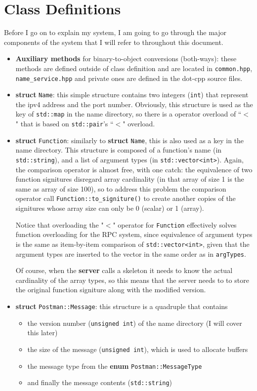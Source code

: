 \section{Class Definitions}
Before I go on to explain my system, I am going to go through the major components of the system that I will refer to throughout this document.

\begin{itemize}
\item
{\bf Auxiliary methods} for binary-to-object conversions (both-ways): these methods are defined outside of class definition and are located in {\tt common.hpp}, {\tt name\_service.hpp} and private ones are defined in the dot-cpp source files.
\item
{\bf struct} {\tt Name}: this simple structure contains two integers ({\tt int}) that represent the ipv4 address and the port number.
Obviously, this structure is used as the key of {\tt std::map} in the name directory, so there is a operator overload of ``$<$" that is based on {\tt std::pair}'s ``$<$" overload.

\item
{\bf struct} {\tt Function}: similarly to {\bf struct} {\tt Name}, this is also used as a key in the name directory.
This structure is composed of a function's name (in {\tt std::string}), and a list of argument types (in {\tt std::vector<int>}).
Again, the comparison operator is almost free, with one catch: the equivalence of two function signitures disregard array cardinality (in that array of size 1 is the same as array of size 100), so to address this problem the comparison operator call {\tt Function::to\_signiture()} to create another copies of the signitures whose array size can only be 0 (scalar) or 1 (array).

Notice that overloading the "$<$" operator for {\tt Function} effectively solves function overloading for the RPC system, since equivalence of argument types is the same as item-by-item comparison of {\tt std::vector<int>}, given that the argument types are inserted to the vector in the same order as in {\tt argTypes}.

Of course, when the {\bf server} calls a skeleton it needs to know the actual cardinality of the array types, so this means that the server needs to to store the original function signiture along with the modified version.

\item
{\bf struct} {\tt Postman::Message}: this structure is a quadruple that contains
\begin{itemize}
\item
the version number ({\tt unsigned int}) of the name directory (I will cover this later)
\item
the size of the message ({\tt unsigned int}), which is used to allocate buffers
\item
the message type from the {\bf enum} {\tt Postman::MessageType}
\item
and finally the message contents ({\tt std::string})
\end{itemize}


\end{itemize}
